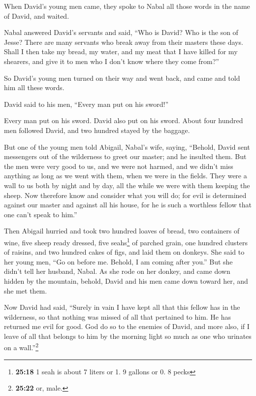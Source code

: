  When David's young men came, they spoke to Nabal all
those words in the name of David, and waited.

 Nabal answered David's servants and said, ``Who is
David? Who is the son of Jesse? There are many servants who break away
from their masters these days.  Shall I then take my
bread, my water, and my meat that I have killed for my shearers, and
give it to men who I don't know where they come from?''

 So David's young men turned on their way and went back,
and came and told him all these words.

 David said to his men, ``Every man put on his sword!''

Every man put on his sword. David also put on his sword. About four
hundred men followed David, and two hundred stayed by the baggage.

 But one of the young men told Abigail, Nabal's wife,
saying, ``Behold, David sent messengers out of the wilderness to greet
our master; and he insulted them.  But the men were very
good to us, and we were not harmed, and we didn't miss anything as long
as we went with them, when we were in the fields.  They
were a wall to us both by night and by day, all the while we were with
them keeping the sheep.  Now therefore know and consider
what you will do; for evil is determined against our master and against
all his house, for he is such a worthless fellow that one can't speak to
him.''

 Then Abigail hurried and took two hundred loaves of
bread, two containers of wine, five sheep ready dressed, five
seahs\footnote{\textbf{25:18} 1 seah is about 7 liters or 1. 9 gallons
  or 0. 8 pecks} of parched grain, one hundred clusters of raisins, and
two hundred cakes of figs, and laid them on donkeys.  She
said to her young men, ``Go on before me. Behold, I am coming after
you.'' But she didn't tell her husband, Nabal.  As she
rode on her donkey, and came down hidden by the mountain, behold, David
and his men came down toward her, and she met them.

 Now David had said, ``Surely in vain I have kept all
that this fellow has in the wilderness, so that nothing was missed of
all that pertained to him. He has returned me evil for good.
 God do so to the enemies of David, and more also, if I
leave of all that belongs to him by the morning light so much as one who
urinates on a wall.''\footnote{\textbf{25:22} or, male.}

